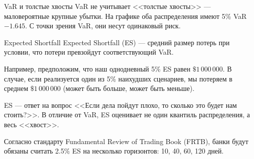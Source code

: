 \documentclass{beamer}
\begin{document}
\begin{frame}{VaR и толстые хвосты}
\justify
VaR не учитывает <<толстые хвосты>> --- маловероятные крупные убытки. На графике оба распределения имеют 5\% VaR $-1.645$. С точки зрения VaR, они несут одинаковый риск.

\justify
\centering
{}
\end{frame}



\begin{frame}{Expected Shortfall}
\justify
\alert{Expected Shortfall (ES)} --- средний размер потерь при условии, что потери превзойдут соответствующий VaR.

\justify
Например, предположим, что наш однодневный 5\% ES равен $\$1\,000\,000$. В случае, если реализуется один из 5\% наихудших сценариев, мы потеряем в среднем $\$1\,000\,000$ (может быть больше, может быть меньше).

\justify
ES --- ответ на вопрос <<Если дела пойдут плохо, то сколько это будет нам стоить?>>. В отличие от VaR, ES оценивает не один квантиль распределения, а весь <<хвост>>.

\justify
Согласно стандарту Fundamental Review of Trading Book (FRTB), банки будут обязаны считать 2.5\% ES на несколько горизонтов: 10, 40, 60, 120 дней.
\end{frame}
\end{document}
